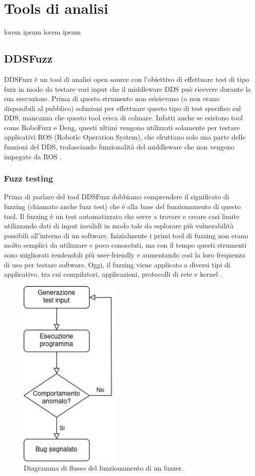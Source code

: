 \chapter{Tools di analisi}
lorem ipsum lorem ipsum
\section{DDSFuzz}
DDSFuzz è un tool di analisi open source con l'obiettivo di 
effettuare test di tipo fuzz
in modo da testare vari input che il middleware DDS può
ricevere durante la sua esecuzione. Prima di questo strumento 
non esistevano (o non erano disponibili al pubblico) soluzioni
per effettuare questo tipo di test specifico sul DDS, mancanza
che questo tool cerca di colmare. Infatti anche se esistono tool 
come RoboFuzz e Deng, questi ultimi vengono utilizzati solamente
per testare applicativi ROS (Robotic Operation System), che 
sfruttano solo una parte delle funzioni del DDS, tralasciando
funzionalità del middleware che non vengono impegate
da ROS \cite{10.1145/3691620.3695073}.


\subsection{Fuzz testing}
Prima di parlare del tool DDSFuzz dobbiamo comprendere 
il significato di fuzzing (chiamato anche fuzz test) che è
alla base del funzionamento di questo tool. Il fuzzing è un test
automatizzato che serve a trovare e creare casi limite utilizzando
dati di input invalidi in modo tale da esplorare più vulnerabilità
possibili all'interno di un software. 
Inizialmente i primi tool di fuzzing non erano molto 
semplici da utilizzare e poco conosciuti, 
ma con il tempo questi strumenti
sono migliorati rendendoli più user-friendly e aumentando così la 
loro frequenza di uso per testare software. Oggi, il fuzzing viene
applicato a diversi tipi di applicativo, tra cui compilatori, 
applicazioni, protocolli di rete e kernel \cite{8371326}.

\begin{figure}[H]
    \centering
    \includegraphics[width=5cm, keepaspectratio]{img/Diagramma di flusso fuzzer.jpg}
    \caption{Diagramma di flusso del funzionamento di un fuzzer.}
    \label{funzionamento fuzzer}
\end{figure}

